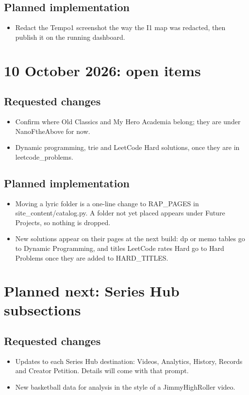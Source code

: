 \documentclass[11pt]{article}
\begin{document}
\subsection{Planned implementation}
\begin{itemize}
\item Redact the Tempo1 screenshot the way the I1 map was redacted, then publish it on the running dashboard.
\end{itemize}

\section{10 October 2026: open items}
\subsection{Requested changes}
\begin{itemize}
\item Confirm where Old Classics and My Hero Academia belong; they are under NanoFtheAbove for now.
\item Dynamic programming, trie and LeetCode Hard solutions, once they are in leetcode\_problems.
\end{itemize}
\subsection{Planned implementation}
\begin{itemize}
\item Moving a lyric folder is a one-line change to RAP\_PAGES in site\_content/catalog.py. A folder not yet placed appears under Future Projects, so nothing is dropped.
\item New solutions appear on their pages at the next build: dp or memo tables go to Dynamic Programming, and titles LeetCode rates Hard go to Hard Problems once they are added to HARD\_TITLES.
\end{itemize}

\section{Planned next: Series Hub subsections}
\subsection{Requested changes}
\begin{itemize}
\item Updates to each Series Hub destination: Videos, Analytics, History, Records and Creator Petition. Details will come with that prompt.
\item New basketball data for analysis in the style of a JimmyHighRoller video.
\end{itemize}
\end{document}
